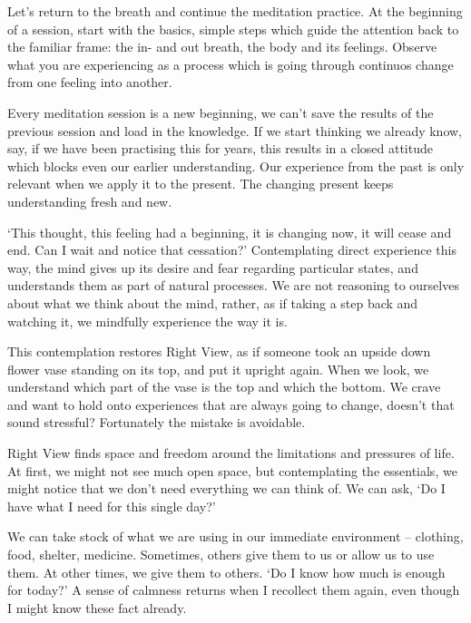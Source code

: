 
\noindent Let's return to the breath and continue the meditation
practice. At the beginning of a session, start with the basics, simple
steps which guide the attention back to the familiar frame: the in- and
out breath, the body and its feelings. Observe what you are experiencing
as a process which is going through continuos change from one feeling
into another.

Every meditation session is a new beginning, we can't save the results
of the previous session and load in the knowledge. If we start thinking
we already know, say, if we have been practising this for years, this
results in a closed attitude which blocks even our earlier
understanding. Our experience from the past is only relevant when we
apply it to the present. The changing present keeps understanding fresh
and new.

`This thought, this feeling had a beginning, it is changing now, it will
cease and end. Can I wait and notice that cessation?' Contemplating
direct experience this way, the mind gives up its desire and fear
regarding particular states, and understands them as part of natural
processes. We are not reasoning to ourselves about what we think about
the mind, rather, as if taking a step back and watching it, we mindfully
experience the way it is.

This contemplation restores Right View, as if someone took an upside
down flower vase standing on its top, and put it upright again. When we
look, we understand which part of the vase is the top and which the
bottom. We crave and want to hold onto experiences that are always going
to change, doesn't that sound stressful? Fortunately the mistake is
avoidable.


Right View finds space and freedom around the limitations and pressures
of life. At first, we might not see much open space, but contemplating
the essentials, we might notice that we don't need everything we can
think of. We can ask, `Do I have what I need for this single day?'

We can take stock of what we are using in our immediate environment --
clothing, food, shelter, medicine. Sometimes, others give them to us or
allow us to use them. At other times, we give them to others. `Do I know
how much is enough for today?' A sense of calmness returns when I
recollect them again, even though I might know these fact already.


